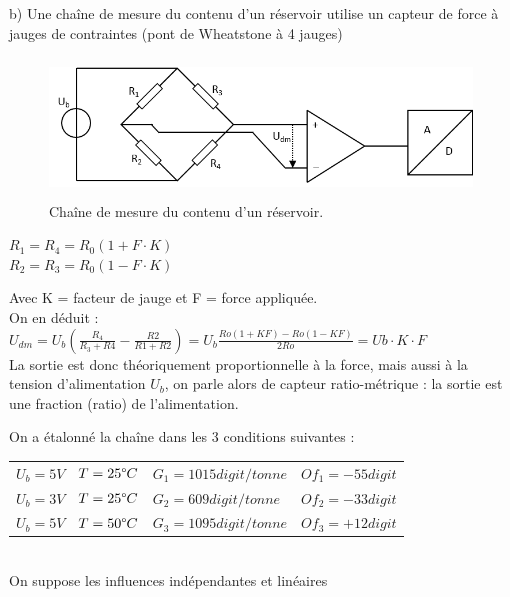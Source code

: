 b)	Une chaîne de mesure du contenu d'un réservoir utilise un capteur de force à jauges de contraintes (pont de Wheatstone à 4 jauges)

\begin{figure}[h!]
    \centering
    \includegraphics[height=3.7cm]{assets/figures/Exercice_3_5_c.PNG}
    \caption{Chaîne de mesure du contenu d'un réservoir.}
    \label{fig:Exercice_3_5_c}
\end{figure}

\begin{center}
    $R_1 = R_4 = R_0(1 + F \cdot K)$\\
    $R_2 = R_3 = R_0(1 - F \cdot K)$\\
\end{center}

Avec K = facteur de jauge et F = force appliquée.\\

On en déduit :	$U_{dm} = U_b ( \frac{ R_4}{R_3+R4} - \frac{R2}{R1+R2} ) = U_b \frac{ Ro(1+KF) -Ro(1-KF)}{2Ro}  = Ub \cdot K \cdot F$ \\
La sortie est donc théoriquement proportionnelle à la force, mais aussi à la tension d'alimentation $U_b$, on parle alors de capteur ratio-métrique : la sortie est une fraction (ratio) de l'alimentation.

On a étalonné la chaîne dans les 3 conditions suivantes :\\

\begin {center}
\begin{tabular}{llll}
    $U_b = 5V$ & $T=25 \degree C$ & $G_1 = 1015 digit/tonne$ & $Of_1 = -55 digit$ \\
    $U_b = 3V$ & $T=25 \degree C$ & $G_2 = 609 digit/tonne$  & $Of_2 = -33 digit$ \\
    $U_b = 5V$ & $T=50 \degree C$ & $G_3 = 1095 digit/tonne$ & $Of_3 = +12 digit$ \\
\end{tabular}
\end{center}
~\\
On suppose les influences indépendantes et linéaires

